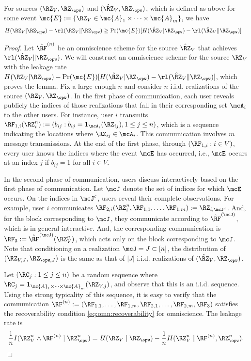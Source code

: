 {\begin{lemma}\label{lem:hatsource}
For sources $(\RZ_V,\RZ_{\opw})$ and $(\hat{\RZ}_V,\RZ_{\opw})$, which is defined as above for some event $\mc{E}:=\{\RZ_V \in \mc{A}_{1}\times\cdots\times\mc{A}_{m}\}$, we have 
\begin{align}
    &H(\RZ_V|\RZ_{\opw})-\rl(\RZ_V\|\RZ_{\opw}) %
    \geq \Pr(\mc{E})[H(\hat{\RZ}_V|\RZ_{\opw})-\rl(\hat{\RZ}_V\|\RZ_{\opw})]
\end{align}
\end{lemma}
\begin{proof}
Let $\hat{\RF}^{(n)}$ be an omniscience scheme for the source $\hat{\RZ}_V$ that achieves $\rl(\hat{\RZ}_V\|\RZ_{\opw})$. We will construct an omniscience scheme for the source $\RZ_V$ with the leakage rate $H(\RZ_V|\RZ_{\opw})-\Pr(\mc{E})[H(\hat{\RZ}_V|\RZ_{\opw})-\rl(\hat{\RZ}_V\|\RZ_{\opw})]$, which proves the lemma. Fix a large enough $n$ and consider $n$ i.i.d. realizations of the source  $(\RZ_V,\RZ_{\opw})$. In the first phase of communication, each user reveals publicly the indices of those realizations that fall in their corresponding set $\mcA_i$ to the other users. For instance, user $i$ transmits $\RF_{1,i}(\RZ_i^n):= (b_{ij} : b_{ij} = \mathbf{1}_{\mcA_i}(\RZ_{ij}), 1\leq j\leq n)$, which is a sequence indicating the locations where $\RZ_{ij} \in \mcA_i$. This communication involves $m$ message transmissions. At the end of the first phase, through $(\RF_{1,i}: i \in V)$, every user knows the indices where the event $\mcE$ has occurred, i.e., $\mcE$ occurs at an index $j$ if $b_{ij}=1$ for all $i \in V$.  

In the second phase of communication, users discuss interactively based on the first phase of communication. Let $\mcJ$ denote the set of indices for which $\mcE$ occurs. On the indices in $\mcJ^c$, users reveal their complete observations. For example, user $i$ communicates $\RF_{2,i}(\RZ_i^n, \RF_{1,1}, \ldots, \RF_{1,m}):= \RZ_{i,\mcJ^c}$. And, for the block corresponding to $\mcJ$, they communicate according to $\hat{\RF}^{(\mcJ)}$, which is in general interactive. And, the corresponding communication is $\RF_3:=\hat{\RF}^{(\mcJ)}(\RZ^n_V)$, which acts only on the block corresponding to $\mcJ$. Note that conditioning on a realization $\mcJ=J \subset [n]$, the distribution of  $(\RZ_{V,J},\RZ_{\opw,J})$ is the same as that of $|J|$ i.i.d. realizations of $(\hat{\RZ}_V,\RZ_{\opw})$. 

Let $(\RC_j:1\leq j\leq n)$ be a random sequence where $\RC_j = \mathbf{1}_{\mc{A}_{1}\times\cdots\times\mc{A}_{m}}(\RZ_{V,j})$, and observe that this is an i.i.d. sequence. Using the strong typicality of this sequence, it is easy to verify that the communication $\RF^{(n)}:= (\RF_{1,1}, \ldots, \RF_{1,m},\RF_{2,1}, \ldots, \RF_{2,m},\RF_3)$ satisfies the recoverability condition \eqref{eq:omn:recoverability} for omniscience.  The leakage rate is 
\begin{align*}
    \frac{1}{n} I(\RZ_V^{n} \wedge \RF^{(n)} \mid \RZ_{\opw}^n) = H(\RZ_V \mid \RZ_{\opw}) - \frac{1}{n}H(\RZ_V^{n} \mid \RF^{(n)}, \RZ_{\opw}^n).
\end{align*}


\end{proof}}
